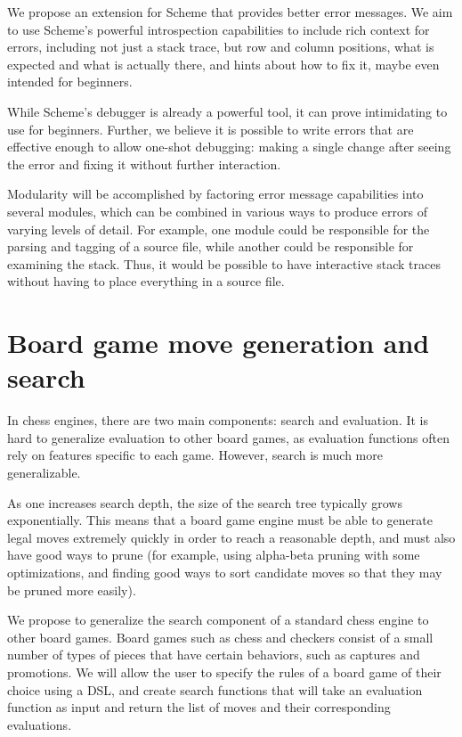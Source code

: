 \documentclass{scrartcl}
\begin{document}
We propose an extension for Scheme that provides better error messages. We aim
to use Scheme's powerful introspection capabilities to include rich context for
errors, including not just a stack trace, but row and column positions, what is
expected and what is actually there, and hints about how to fix it, maybe even
intended for beginners.

While Scheme's debugger is already a powerful tool, it can prove intimidating
to use for beginners. Further, we believe it is possible to write errors that
are effective enough to allow one-shot debugging: making a single change after
seeing the error and fixing it without further interaction.

Modularity will be accomplished by factoring error message capabilities into
several modules, which can be combined in various ways to produce errors of
varying levels of detail. For example, one module could be responsible for the
parsing and tagging of a source file, while another could be responsible for
examining the stack. Thus, it would be possible to have interactive stack
traces without having to place everything in a source file.


\section{Board game move generation and search}
In chess engines, there are two main components: search and evaluation.
It is hard to generalize evaluation to other board games,
as evaluation functions often rely on features specific to each game.
However, search is much more generalizable.

As one increases search depth, the size of the search tree typically grows
exponentially. This means that a board game engine must be able to
generate legal moves extremely quickly in order to reach a reasonable depth,
and must also have good ways to prune
(for example, using alpha-beta pruning with some optimizations, and finding
good ways to sort candidate moves so that they may be pruned more easily).

We propose to generalize the search component of a standard chess engine
to other board games. Board games such as chess and checkers consist of
a small number of types of pieces that have certain behaviors,
such as captures and promotions.
We will allow the user to specify the rules of a board game
of their choice using a DSL, and create search functions that will
take an evaluation function as input and return the list of moves
and their corresponding evaluations.
\end{document}
